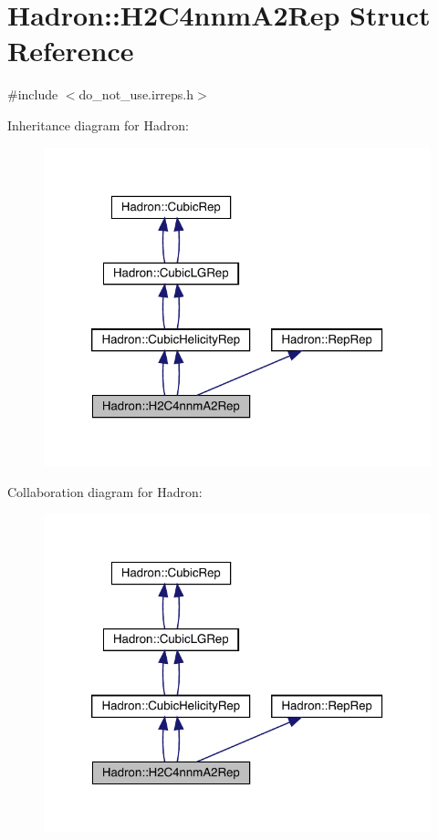 \hypertarget{structHadron_1_1H2C4nnmA2Rep}{}\section{Hadron\+:\+:H2\+C4nnm\+A2\+Rep Struct Reference}
\label{structHadron_1_1H2C4nnmA2Rep}


{\ttfamily \#include $<$do\+\_\+not\+\_\+use.\+irreps.\+h$>$}



Inheritance diagram for Hadron\+:\nopagebreak
\begin{figure}[H]
\begin{center}
\leavevmode
\includegraphics[width=320pt]{d0/deb/structHadron_1_1H2C4nnmA2Rep__inherit__graph}
\end{center}
\end{figure}


Collaboration diagram for Hadron\+:\nopagebreak
\begin{figure}[H]
\begin{center}
\leavevmode
\includegraphics[width=320pt]{d7/d46/structHadron_1_1H2C4nnmA2Rep__coll__graph}
\end{center}
\end{figure}

